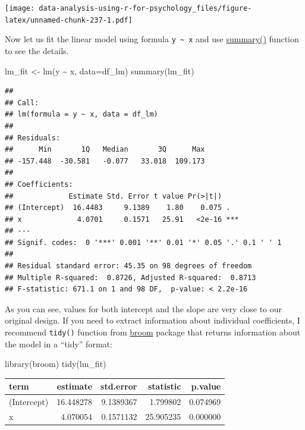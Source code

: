\documentclass[
]{book}
\newenvironment{Shaded}{\begin{snugshade}}{\end{snugshade}}
\newcommand{\AttributeTok}[1]{\textcolor[rgb]{0.77,0.63,0.00}{#1}}
\newcommand{\FunctionTok}[1]{\textcolor[rgb]{0.00,0.00,0.00}{#1}}
\newcommand{\NormalTok}[1]{#1}
\newcommand{\OtherTok}[1]{\textcolor[rgb]{0.56,0.35,0.01}{#1}}
\newcommand{\SpecialCharTok}[1]{\textcolor[rgb]{0.00,0.00,0.00}{#1}}
\begin{document}
\texttt{[image: data-analysis-using-r-for-psychology\_files/figure-latex/unnamed-chunk-237-1.pdf]}

Now let us fit the linear model using formula \texttt{y\ \textasciitilde{}\ x} and use \href{https://stat.ethz.ch/R-manual/R-devel/library/stats/html/summary.lm.html}{summary()} function to see the details.

\begin{Shaded}
\begin{Highlighting}[]
\NormalTok{lm\_fit }\OtherTok{\textless{}{-}} \FunctionTok{lm}\NormalTok{(y }\SpecialCharTok{\textasciitilde{}}\NormalTok{ x, }\AttributeTok{data=}\NormalTok{df\_lm)}
\FunctionTok{summary}\NormalTok{(lm\_fit)}
\end{Highlighting}
\end{Shaded}

\begin{verbatim}
## 
## Call:
## lm(formula = y ~ x, data = df_lm)
## 
## Residuals:
##      Min       1Q   Median       3Q      Max 
## -157.448  -30.581   -0.077   33.018  109.173 
## 
## Coefficients:
##             Estimate Std. Error t value Pr(>|t|)    
## (Intercept)  16.4483     9.1389    1.80    0.075 .  
## x             4.0701     0.1571   25.91   <2e-16 ***
## ---
## Signif. codes:  0 '***' 0.001 '**' 0.01 '*' 0.05 '.' 0.1 ' ' 1
## 
## Residual standard error: 45.35 on 98 degrees of freedom
## Multiple R-squared:  0.8726, Adjusted R-squared:  0.8713 
## F-statistic: 671.1 on 1 and 98 DF,  p-value: < 2.2e-16
\end{verbatim}

As you can see, values for both intercept and the slope are very close to our original design. If you need to extract information about individual coefficients, I recommend \texttt{tidy()} function from \href{https://github.com/tidymodels/broom}{broom} package that returns information about the model in a ``tidy'' format:

\begin{Shaded}
\begin{Highlighting}[]
\FunctionTok{library}\NormalTok{(broom)}
\FunctionTok{tidy}\NormalTok{(lm\_fit)}
\end{Highlighting}
\end{Shaded}

\begin{tabular}{l|r|r|r|r}
\hline
term & estimate & std.error & statistic & p.value\\
\hline
(Intercept) & 16.448278 & 9.1389367 & 1.799802 & 0.074969\\
\hline
x & 4.070054 & 0.1571132 & 25.905235 & 0.000000\\
\hline
\end{tabular}
\end{document}
